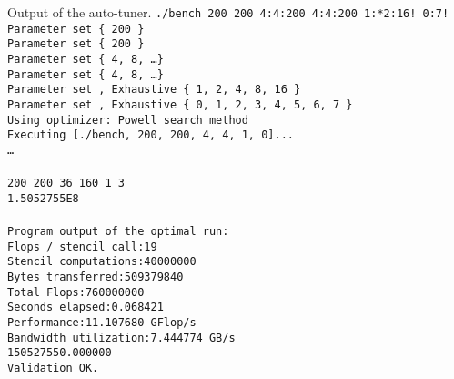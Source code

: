 \begin{example}{Output of the auto-tuner.}
	\label{ex:patustuneresult}
	\footnotesize
	\noindent\texttt{./bench 200 200 4:4:200 4:4:200 1:*2:16! 0:7!\\
	Parameter set \{ 200 \}\\
	Parameter set \{ 200 \}\\
	Parameter set \{ 4, 8, \dots \}\\
	Parameter set \{ 4, 8, \dots \}\\
	Parameter set , Exhaustive \{ 1, 2, 4, 8, 16 \}\\
	Parameter set , Exhaustive \{ 0, 1, 2, 3, 4, 5, 6, 7 \}\\
	Using optimizer: Powell search method\\
	Executing [./bench, 200, 200, 4, 4, 1, 0]...\\
	\dots\\
	\\
	200 200 36 160 1 3\\
	1.5052755E8\\
	\\
	Program output of the optimal run:\\
	Flops / stencil call:\phantom{XX}19\\
	Stencil computations:\phantom{XX}40000000\\
	Bytes transferred:\phantom{XXXXX}509379840\\
	Total Flops:\phantom{XXXXXXXXXXX}760000000\\
	Seconds elapsed:\phantom{XXXXXXX}0.068421\\
	Performance:\phantom{XXXXXXXXXXX}11.107680 GFlop/s\\
	Bandwidth utilization:\phantom{X}7.444774 GB/s\\
	150527550.000000\\
	Validation OK.}
\end{example}

